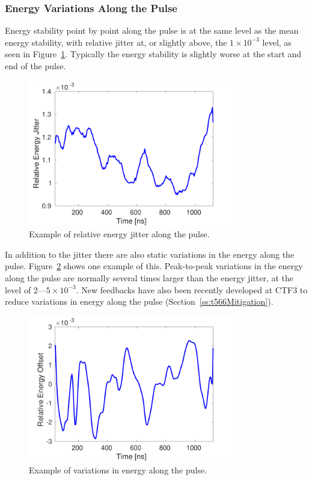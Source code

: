 \subsubsection{Energy Variations Along the Pulse}

Energy stability point by point along the pulse is at the same level as the mean energy stability, with relative jitter at, or slightly above, the \(1 \times 10^{-3}\) level, as seen in Figure~\ref{f:enJitter_along}. Typically the energy stability is slightly worse at the start and end of the pulse.

\begin{figure}
  \centering
  \includegraphics[width=0.8\textwidth]{Figures/propagation/enJitter_along}
  \caption{Example of relative energy jitter along the pulse.}
  \label{f:enJitter_along}
\end{figure}

In addition to the jitter there are also static variations in the energy along the pulse. Figure~\ref{f:enMeanAlong} shows one example of this. Peak-to-peak variations in the energy along the pulse are normally several times larger than the energy jitter, at the level of 2---\(5\times 10^{-3}\). New feedbacks have also been recently developed at CTF3 to reduce variations in energy along the pulse (Section~\ref{ss:t566Mitigation}).

\begin{figure}
  \centering
  \includegraphics[width=0.8\textwidth]{Figures/propagation/enMeanAlong}
  \caption{Example of variations in energy along the pulse.}
  \label{f:enMeanAlong}
\end{figure}



